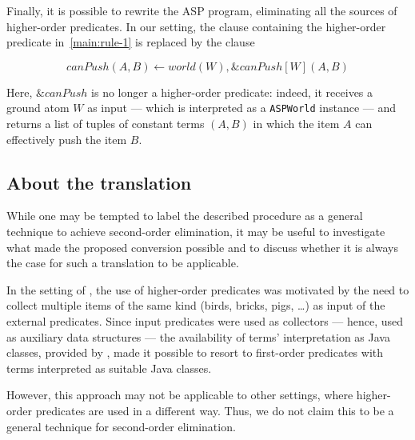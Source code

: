 Finally, it is possible to rewrite the ASP program, eliminating all the sources of higher-order predicates.
In our setting, the clause containing the higher-order predicate in~\eqref{main:rule-1} is replaced by the clause

$$ canPush(A,B) \leftarrow world(W), \&canPush[W](A,B) \label{main:rule-3} $$

Here, $\&canPush$ is no longer a higher-order predicate: indeed, it receives a ground atom $W$ as input --- which is interpreted as a \texttt{ASPWorld} instance --- and returns a list of tuples of constant terms $(A,B)$ in which the item $A$ can effectively push the item $B$.

\subsection{About the translation}

While one may be tempted to label the described procedure as a general technique to achieve second-order elimination, it may be useful to investigate what made the proposed conversion possible and to discuss whether it is always the case for such a translation to be applicable.

In the setting of \ah, the use of higher-order predicates was motivated by the need to collect multiple items of the same kind (birds, bricks, pigs, \ldots) as input of the external predicates.
Since input predicates were used as collectors --- hence, used as auxiliary data structures --- the availability of terms' interpretation as Java classes, provided by \al, made it possible to resort to first-order predicates with terms interpreted as suitable Java classes.

However, this approach may not be applicable to other settings, where higher-order predicates are used in a different way.
Thus, we do not claim this to be a general technique for second-order elimination.

